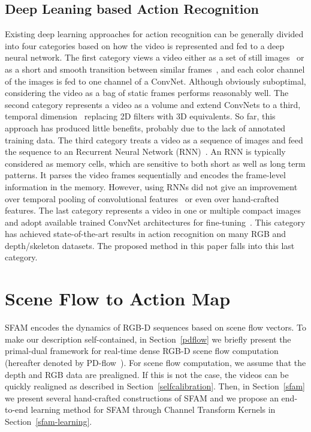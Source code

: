 \documentclass[10pt,twocolumn,letterpaper]{article}
\begin{document}
\subsection{Deep Leaning based Action Recognition}\label{dl4ar}
Existing deep learning approaches for action recognition can be generally 
divided into four categories based on how the video is represented and fed to a 
deep neural network. The first category views a video either as a set of still 
images~\cite{yue2015beyond} or as a short and smooth transition between similar 
frames~\cite{simonyan2014two}, and each color channel of the images is fed to 
one channel of a ConvNet. Although obviously suboptimal, considering the video 
as a bag of static frames performs reasonably well. The second category 
represents a video as a volume and extend ConvNets to a third, temporal 
dimension~\cite{ji20133d,tran2015learning} replacing 2D filters with 3D 
equivalents. So far, this approach has produced little benefits, probably due to 
the lack of annotated training data. The third category treats a video as 
a sequence of images and feed the sequence to an Recurrent Neural Network 
(RNN)~\cite{donahue2015long,du2015hierarchical,veeriah2015differential,shahroudy2016ntu,liu2016spatio,junliu2017}. An RNN is typically considered as memory 
cells, which are sensitive to both short as well as long term patterns. It 
parses the video frames sequentially and encodes the frame-level information in 
the memory. However, using RNNs did not give an improvement over temporal 
pooling of convolutional features~\cite{yue2015beyond} or even over hand-crafted 
features. The last category represents a video in one or multiple compact 
images and adopt available trained ConvNet architectures for 
fine-tuning~\cite{pichao2015,pichaoTHMS,pichao2016,bilen2016dynamic,hou2016skeleton,pichaoicprwb,pichaoicprwa}. This 
category has achieved state-of-the-art results in action recognition on many 
RGB and depth/skeleton datasets. The proposed method in this paper falls into 
this last category.


\section{Scene Flow to Action Map}\label{SFAM}

SFAM encodes the dynamics of RGB-D sequences based 
on scene flow vectors. 
To make our description self-contained, in Section~\ref{pdflow} we briefly 
present the primal-dual framework for real-time dense RGB-D scene flow 
computation (hereafter denoted by PD-flow~\cite{jaimezprimal}). For scene flow 
computation, we assume that the depth and RGB data are prealigned. If this is 
not the case, the videos can be quickly realigned as described in 
Section~\ref{selfcalibration}. Then, in Section~\ref{sfam} we present several 
hand-crafted constructions of SFAM  and we propose an end-to-end learning 
method for SFAM through Channel Transform Kernels in 
Section~\ref{sfam-learning}.
\end{document}

